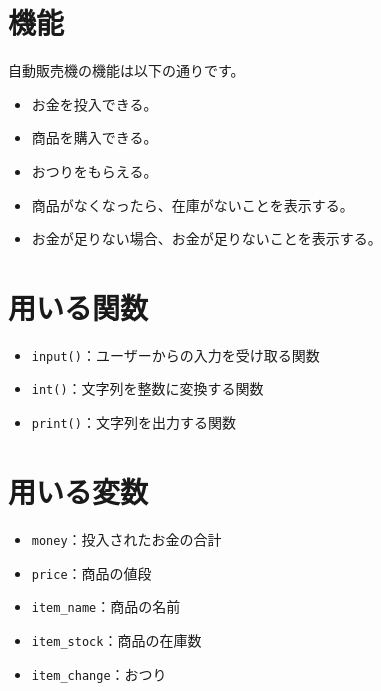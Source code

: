 \documentclass[a4paper,titlepage,dvipdfmx]{jarticle}
\begin{document}
\section{機能}
自動販売機の機能は以下の通りです。
\begin{itemize}
  \item お金を投入できる。
  \item 商品を購入できる。
  \item おつりをもらえる。
  \item 商品がなくなったら、在庫がないことを表示する。
  \item お金が足りない場合、お金が足りないことを表示する。
\end{itemize}

\section{用いる関数}
\begin{itemize}
  \item \texttt{input()}：ユーザーからの入力を受け取る関数
  \item \texttt{int()}：文字列を整数に変換する関数
  \item \texttt{print()}：文字列を出力する関数
\end{itemize}

\section{用いる変数}
\begin{itemize}
  \item \texttt{money}：投入されたお金の合計
  \item \texttt{price}：商品の値段
  \item \texttt{item\_name}：商品の名前
  \item \texttt{item\_stock}：商品の在庫数
  \item \texttt{item\_change}：おつり
\end{itemize}
\end{document}
